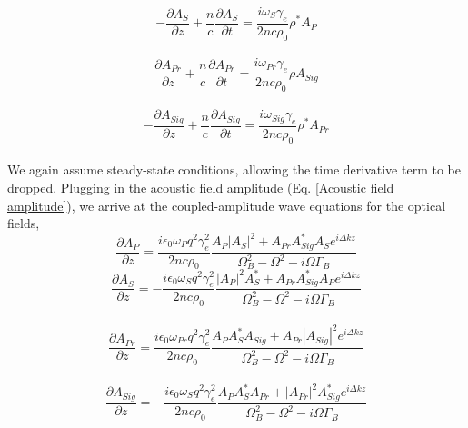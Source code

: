\documentclass[pdflatex,iicol]{sn-jnl}%
\begin{document}
\begin{equation}
    -\frac{\partial A_{S}}{\partial z} + \frac{n}{c}\frac{\partial A_{S}}{\partial t} = \frac{i\omega_{S}\gamma_{e}}{2nc\rho_{0}}\rho^{*}A_{P}
\end{equation}
\\
\begin{equation}
    \frac{\partial A_{Pr}}{\partial z} + \frac{n}{c}\frac{\partial A_{Pr}}{\partial t} = \frac{i\omega_{Pr}\gamma_{e}}{2nc\rho_{0}}\rho A_{Sig}
\end{equation}
\\
\begin{equation}
    -\frac{\partial A_{Sig}}{\partial z} + \frac{n}{c}\frac{\partial A_{Sig}}{\partial t} = \frac{i\omega_{Sig}\gamma_{e}}{2nc\rho_{0}}\rho^{*}A_{Pr}
\end{equation}
\\
We again assume steady-state conditions, allowing the time derivative term to be dropped. Plugging in the acoustic field amplitude (Eq. \ref{Acoustic field amplitude}), we arrive at the coupled-amplitude wave equations for the optical fields,
\begin{equation}
    \frac{\partial A_{P}}{\partial z} = \frac{i\epsilon_{0}\omega_{P} q^{2}\gamma_{e}^{2}}{2nc\rho_{0}}\frac{A_{P}|A_{S}|^{2} + A_{Pr}A_{Sig}^{*}A_{S}e^{i\Delta kz}}{\Omega_{B}^{2} - \Omega^{2} - i\Omega\Gamma_{B}}
\end{equation}
\begin{equation}
    \frac{\partial A_{S}}{\partial z} = -\frac{i\epsilon_{0}\omega_{S} q^{2}\gamma_{e}^{2}}{2nc\rho_{0}}\frac{|A_{P}|^{2}A_{S}^{*} + A_{Pr}A_{Sig}^{*}A_{P}e^{i\Delta kz}}{\Omega_{B}^{2} - \Omega^{2} - i\Omega\Gamma_{B}}
\end{equation}
\\
\begin{equation}
    \frac{\partial A_{Pr}}{\partial z} = \frac{i\epsilon_{0}\omega_{Pr} q^{2}\gamma_{e}^{2}}{2nc\rho_{0}}\frac{A_{P}A_{S}^{*}A_{Sig} + A_{Pr}|A_{Sig}|^{2}e^{i\Delta kz}}{\Omega_{B}^{2} - \Omega^{2} - i\Omega\Gamma_{B}}
\end{equation}
\\
\begin{equation}
    \frac{\partial A_{Sig}}{\partial z} = -\frac{i\epsilon_{0}\omega_{S} q^{2}\gamma_{e}^{2}}{2nc\rho_{0}}\frac{A_{P}A_{S}^{*}A_{Pr} + |A_{Pr}|^{2}A_{Sig}^{*}e^{i\Delta kz}}{\Omega_{B}^{2} - \Omega^{2} - i\Omega\Gamma_{B}}
\end{equation}
\\


\end{document}
